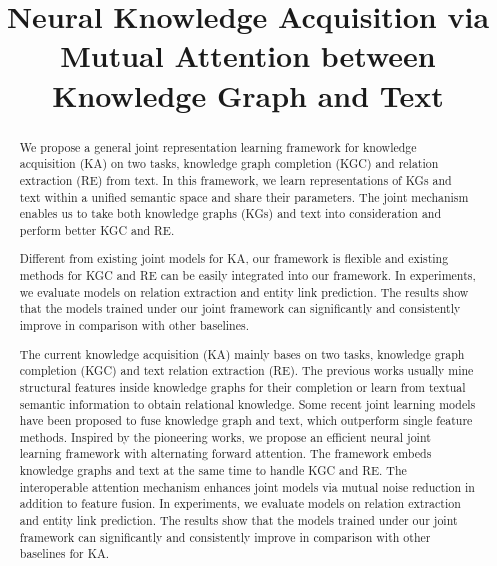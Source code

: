 \documentclass[letterpaper]{article} %
\begin{document}
%
\title{Neural Knowledge Acquisition via Mutual Attention between Knowledge Graph and Text}
\maketitle
\begin{abstract}



We propose a general joint representation learning framework for knowledge acquisition (KA) on two tasks, knowledge graph completion (KGC) and relation extraction (RE) from text. In this framework, we learn representations of KGs and text within a unified semantic space and share their parameters. The joint mechanism enables us to take both knowledge graphs (KGs) and text into consideration and perform better KGC and RE. 


Different from existing joint models for KA, our framework is flexible and existing methods for KGC and RE can be easily integrated into our framework. In experiments, we evaluate models on relation extraction and entity link prediction. The results show that the models trained under our joint framework can significantly and consistently improve in comparison with other baselines.


The current knowledge acquisition (KA) mainly bases on two tasks, knowledge graph completion (KGC) and text relation extraction (RE). The previous works usually mine structural features inside knowledge graphs for their completion or learn from textual semantic information to obtain relational knowledge. Some recent joint learning models have been proposed to fuse knowledge graph and text, which outperform single feature methods. Inspired by the pioneering works, we propose an efficient neural joint learning framework with alternating forward attention. The framework embeds knowledge graphs and text at the same time to handle KGC and RE. The interoperable attention mechanism enhances joint models via mutual noise reduction in addition to feature fusion. In experiments, we evaluate models on relation extraction and entity link prediction. The results show that the models trained under our joint framework can significantly and consistently improve in comparison with other baselines for KA.


\end{abstract}
\end{document}
